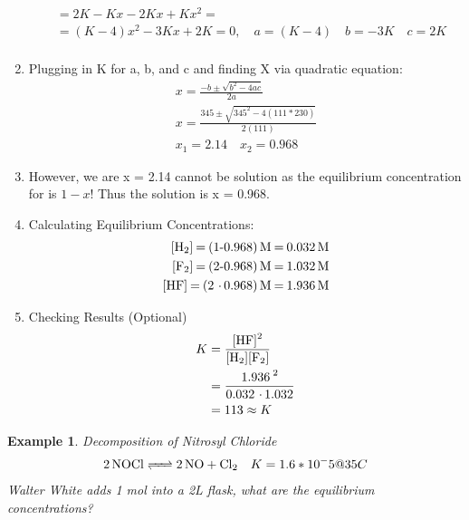 \documentclass{article}  %
\newtheorem{exmp}{Example}
\begin{document}
\begin{enumerate}
\begin{equation*}
\begin{aligned}
            & = 2K - Kx - 2Kx + Kx^2 =  \\
            & = (K-4)x^2 - 3Kx + 2K = 0, \quad a = (K-4) \quad b = -3K \quad c = 2K \\
        \end{aligned}
    \end{equation*}
    \item Plugging in K for a, b, and c and finding X via quadratic equation:
    \begin{equation*}
        \begin{aligned}
            x = \frac{-b\pm\sqrt{b^2-4ac}}{2a} \\
            x = \frac{345\pm\sqrt{345^2-4(111*230)}}{2(111)} \\
            x_1 = 2.14 \quad x_2 = 0.968
        \end{aligned}
    \end{equation*}
    \item However, we are x = 2.14 cannot be solution as the equilibrium concentration for  is $1-x$! Thus the solution is x = 0.968.
    \item Calculating Equilibrium Concentrations:
    \begin{equation*}
        \begin{aligned}
            \ce{[H2] = (1-0.968)M = 0.032M} \\
            \ce{[F2] = (2-0.968)M = 1.032M} \\
            \ce{[HF] = (2*0.968)M = 1.936M} \\
        \end{aligned}
    \end{equation*}
    \item Checking Results (Optional)
    \begin{equation*}
        \begin{aligned}
            K   &= \ce{\frac{[HF]^2}{[H2][F2]}} \\
            &= \ce{\frac{1.936^2}{0.032*1.032}} \\
            &= 113 \approx K
        \end{aligned}
    \end{equation*}
\end{enumerate}

\begin{exmp}
    Decomposition of Nitrosyl Chloride \\
    \begin{equation*}
        \begin{aligned}
            \ce{2 NOCl <=> 2 NO + Cl2} \quad K = 1.6 * 10^-5 @ 35C \\
        \end{aligned}
    \end{equation*}
    Walter White adds 1 mol  into a 2L flask, what are the equilibrium concentrations?
\end{exmp}
\end{document}
